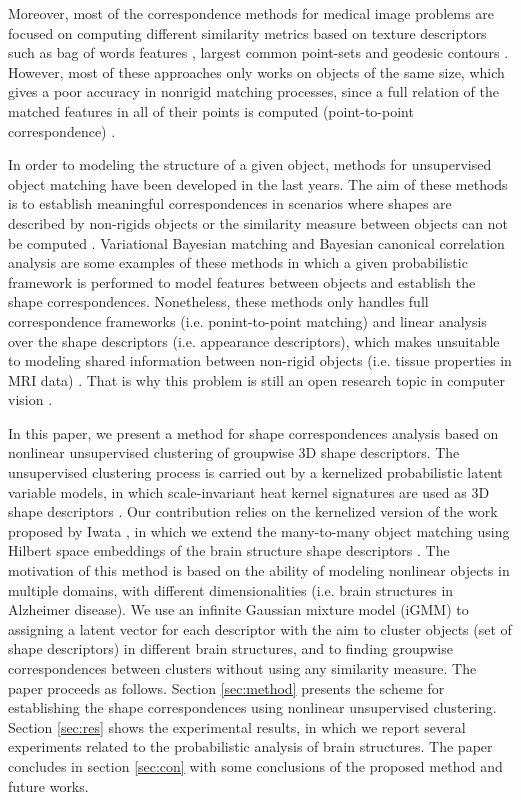 \documentclass[twoside]{article}
\begin{document}
Moreover, most of the correspondence methods for medical image problems are focused on computing different similarity metrics based on texture descriptors such as bag of words features \cite{Bronstein11}, largest common point-sets \cite{Aiger08} and geodesic contours \cite{LiangSW15}. However, most of these approaches only works on objects of the same size, which gives a poor accuracy in nonrigid matching processes, since a full relation of the matched features in all of their points is computed (point-to-point correspondence) \cite{Brunton14}.

In order to modeling the structure of a given object, methods for unsupervised object matching have been developed in the last years. The aim of these methods is to establish meaningful correspondences in scenarios where shapes are described by non-rigids objects or the similarity measure between objects can not be computed \cite{Yang13}. Variational Bayesian matching \cite{Klami12} and Bayesian canonical correlation analysis \cite{Klami13_a} are some examples of these methods in which a given probabilistic framework is performed to model features between objects and establish the shape correspondences. Nonetheless, these methods only handles full correspondence frameworks (i.e. ponint-to-point matching) and linear analysis over the shape descriptors (i.e. appearance descriptors), which makes unsuitable to modeling shared information between non-rigid objects (i.e. tissue properties in MRI data) \cite{vankaick11}. That is why this problem is still an open research topic in computer vision \cite{Cosa13}. 

In this paper, we present a method for shape correspondences analysis based on nonlinear unsupervised clustering of groupwise 3D shape descriptors. The unsupervised clustering process is carried out by a kernelized probabilistic latent variable models, in which scale-invariant heat kernel signatures are used as 3D shape descriptors \cite{Bronstein10}. Our contribution relies on the kernelized version of the work proposed by Iwata \cite{Iwata13}, in which we extend the many-to-many object matching using Hilbert space embeddings of the brain structure shape descriptors \cite{Sriperumbudur10}. The motivation of this method is based on the ability of modeling nonlinear objects in multiple domains, with different dimensionalities (i.e. brain structures in Alzheimer disease). We use an infinite Gaussian mixture model (iGMM) to assigning a latent vector for each descriptor with the aim to cluster objects (set of shape descriptors) in different brain structures, and to finding groupwise correspondences between clusters without using any similarity measure. The paper proceeds as follows. Section \ref{sec:method} presents the scheme for establishing the shape correspondences using nonlinear unsupervised clustering. Section \ref{sec:res} shows the experimental results, in which we report several experiments related to the probabilistic analysis of brain structures. The paper concludes in section \ref{sec:con} with some conclusions of the proposed method and future works.
\end{document}
